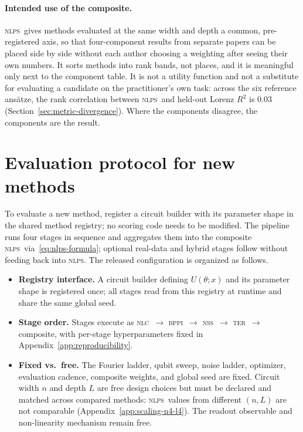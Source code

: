 \documentclass{article}
\newcommand{\nlc}{\textsc{nlc}}
\newcommand{\bppi}{\textsc{bppi}}
\newcommand{\nss}{\textsc{nss}}
\newcommand{\ter}{\textsc{ter}}
\newcommand{\nlps}{\textsc{nlps}}
\begin{document}
\paragraph{Intended use of the composite.}
\nlps\ gives methods evaluated at the same width and depth a common, pre-registered axis, so that four-component results from separate papers can be placed side by side without each author choosing a weighting after seeing their own numbers.
It sorts methods into rank bands, not places, and it is meaningful only next to the component table.
It is not a utility function and not a substitute for evaluating a candidate on the practitioner's own task: across the six reference ans\"atze, the rank correlation between \nlps\ and held-out Lorenz $R^2$ is $0.03$ (Section~\ref{sec:metric-divergence}).
Where the components disagree, the components are the result.

\section{Evaluation protocol for new methods}
\label{sec:evaluation-protocol}

To evaluate a new method, register a circuit builder with its parameter shape in the shared method registry; no scoring code needs to be modified.
The pipeline runs four stages in sequence and aggregates them into the composite \nlps\ via~\eqref{eq:nlps-formula}; optional real-data and hybrid stages follow without feeding back into \nlps.
The released configuration is organized as follows.
\begin{itemize}
  \item \textbf{Registry interface.} A circuit builder defining $U(\theta; x)$ and its parameter shape is registered once; all stages read from this registry at runtime and share the same global seed.
  \item \textbf{Stage order.} Stages execute as \nlc\ $\to$ \bppi\ $\to$ \nss\ $\to$ \ter\ $\to$ composite, with per-stage hyperparameters fixed in Appendix~\ref{app:reproducibility}.
  \item \textbf{Fixed vs.\ free.} The Fourier ladder, qubit sweep, noise ladder, optimizer, evaluation cadence, composite weights, and global seed are fixed.
  Circuit width $n$ and depth $L$ are free design choices but must be declared and matched across compared methods: \nlps\ values from different $(n,L)$ are not comparable (Appendix~\ref{app:scaling-n4-l4}).
  The readout observable and non-linearity mechanism remain free.
\end{itemize}
\end{document}
